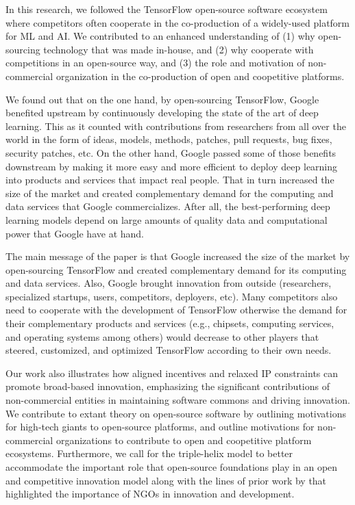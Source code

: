 \documentclass[CHICAGO,Times1COL]{WileyNJDv5} %
\begin{document}
In this research, we followed the TensorFlow open-source software ecosystem where competitors often cooperate in the co-production of a widely-used platform for \ac{ML} and \ac{AI}. We contributed to an enhanced understanding of (1) why open-sourcing technology that was made in-house, and (2) why cooperate with competitions in an open-source way, and (3) the role and motivation of non-commercial organization in the co-production of open and coopetitive platforms. 

We found out that on the one hand, by open-sourcing TensorFlow, Google benefited upstream by continuously developing the state of the art of deep learning. This as it counted with contributions from researchers from all over the world in the form of ideas, models, methods, patches, pull requests, bug fixes, security patches, etc.  On the other hand, Google passed some of those benefits downstream by making it more easy and more efficient to deploy deep learning into products and services that impact real people. That in turn increased the size of the market and created complementary demand for the computing and data services that Google commercializes. After all, the best-performing deep learning models depend on large amounts of quality data and computational power that Google have at hand. 


The main message of the paper is that Google increased the size of the market by open-sourcing TensorFlow and created complementary demand for its computing and data services. Also, Google brought innovation from outside (researchers, specialized startups, users, competitors, deployers, etc). Many competitors also need to cooperate with the development of TensorFlow otherwise the demand for their complementary products and services (e.g., chipsets, computing services, and operating systems among others) would decrease to other players that steered, customized, and optimized TensorFlow according to their own needs.   

Our work also  illustrates how aligned incentives and relaxed IP constraints can promote broad-based innovation, emphasizing the significant contributions of non-commercial entities in maintaining software commons and driving innovation. We contribute to extant theory on open-source software by  outlining motivations for high-tech giants to open-source platforms, and outline motivations for non-commercial organizations to contribute to open and coopetitive platform ecosystems. Furthermore, we call for the triple-helix model to better accommodate the important role that open-source foundations play in an open and competitive innovation model along with the lines of prior work by \citep{SIANIPAR2012197} that highlighted the importance of NGOs in innovation and development. 







\end{document}
